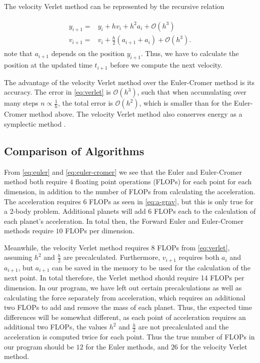 \documentclass[../main.tex]{subfiles}
\begin{document}
The velocity Verlet method can be represented by the recursive relation

\begin{align}
    \begin{split}
    y_{i+1} = & y_i+h v_i+h^2 a_i + \mathcal{O}(h^3) \\
    v_{i+1} = & v_i+\frac{h}{2}(a_{i+1}+a_i)+\mathcal{O}(h^3).
    \end{split}
    \label{eq:verlet}
\end{align} note that \ensuremath{a_{i+1}} depends on the position \ensuremath{y_{i+1}}. Thus, we have to calculate the position at the updated time \ensuremath{t_{i+1}} before we compute the next velocity. 

The advantage of the velocity Verlet method over the Euler-Cromer method is its accuracy. The error in \cref{eq:verlet} is $\mathcal{O}(h^3)$, such that when accumulating over many steps $n \propto \frac{1}{h}$, the total error is $\mathcal{O}(h^2)$, which is smaller than for the Euler-Cromer method above. The velocity Verlet method also conserves energy as a symplectic method \cite{Verlet1967}.

\iffalse
\begin{algorithm}[H]
\SetAlgoLined
 
 \caption{Velocity Verlet}
\end{algorithm}
\fi

\subsection{Comparison of Algorithms}

From \cref{eq:euler} and \cref{eq:euler-cromer} we see that the Euler and Euler-Cromer method both require $4$ floating point operations (FLOPs) for each point for each dimension, in addition to the number of FLOPs from calculating the acceleration. The acceleration requires $6$ FLOPs as seen in \cref{eq:a-grav}, but this is only true for a 2-body problem. Additional planets will add $6$ FLOPs each to the calculation of each planet's acceleration. In total then, the Forward Euler and Euler-Cromer methods require $10$ FLOPs per dimension.

Meanwhile, the velocity Verlet method requires $8$ FLOPs from \cref{eq:verlet}, assuming $h^2$ and $\frac{h}{2}$ are precalculated. Furthermore, $v_{i+1}$ requires both $a_{i}$ and $a_{i+1}$, but $a_{i+1}$ can be saved in the memory to be used for the calculation of the next point. In total therefore, the Verlet method should require 14 FLOPs per dimension. In our program, we have left out certain precalculations as well as calculating the force separately from acceleration, which requires an additional two FLOPs to add and remove the mass of each planet. Thus, the expected time differences will be somewhat different, as each point of acceleration requires an additional two FLOPs, the values $h^2$ and $\frac{h}{2}$ are not precalculated and the acceleration is computed twice for each point. Thus the true number of FLOPs in our program should be $12$ for the Euler methods, and $26$ for the velocity Verlet method.
\end{document}
